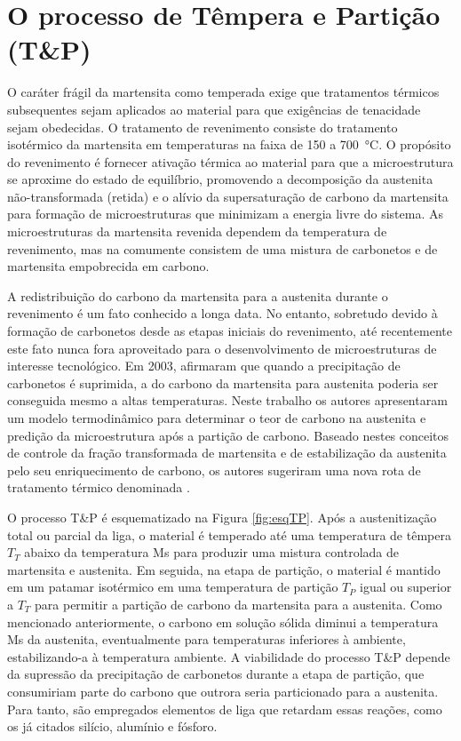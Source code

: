\section{O processo de Têmpera e Partição (T\&P)}

\label{sec:processoTP}
 
O caráter frágil da martensita como temperada exige que tratamentos térmicos subsequentes sejam aplicados ao material para que exigências de tenacidade sejam obedecidas. O tratamento de revenimento consiste do tratamento isotérmico da martensita em temperaturas na faixa de 150 a \SI{700}{\degreeCelsius}. O propósito do revenimento é fornecer ativação térmica ao material para que a microestrutura se aproxime do estado de equilíbrio, promovendo a decomposição da austenita não-transformada (retida) e o alívio da supersaturação de carbono da martensita para formação de microestruturas que minimizam a energia livre do sistema\cite{Honeycombe2006}. As microestruturas da martensita revenida dependem da temperatura de revenimento, mas na comumente consistem de uma mistura de carbonetos e de martensita empobrecida em carbono.

A redistribuição do carbono da martensita para a austenita durante o revenimento é um fato conhecido a longa data\cite{Matas1960}. No entanto, sobretudo devido à formação de carbonetos desde as etapas iniciais do revenimento, até recentemente este fato nunca fora aproveitado para o desenvolvimento de microestruturas de interesse tecnológico. Em 2003,  afirmaram que quando a precipitação de carbonetos é suprimida, a  do carbono da martensita para austenita poderia ser conseguida mesmo a altas temperaturas. Neste trabalho os autores apresentaram um modelo termodinâmico para determinar o teor de carbono na austenita e predição da microestrutura após a partição de carbono. Baseado nestes conceitos de controle da fração transformada de martensita e de estabilização da austenita pelo seu enriquecimento de carbono, os autores sugeriram uma nova rota de tratamento térmico denominada .

O processo T\&P é esquematizado na Figura \ref{fig:esqTP}. Após a austenitização total ou parcial da liga, o material é temperado até uma temperatura de têmpera $T_T$ abaixo da temperatura Ms para produzir uma mistura controlada de martensita e austenita. Em seguida, na etapa de partição, o material é mantido em um patamar isotérmico em uma temperatura de partição $T_P$ igual ou superior a $T_T$ para permitir a partição de carbono da martensita para a austenita. Como mencionado anteriormente, o carbono em solução sólida diminui a temperatura Ms da austenita, eventualmente para temperaturas inferiores à ambiente, estabilizando-a à temperatura ambiente. A viabilidade do processo T\&P depende da supressão da precipitação de carbonetos durante a etapa de partição, que consumiriam parte do carbono que outrora seria particionado para a austenita. Para tanto, são empregados elementos de liga que retardam essas reações, como os já citados silício, alumínio e fósforo.

